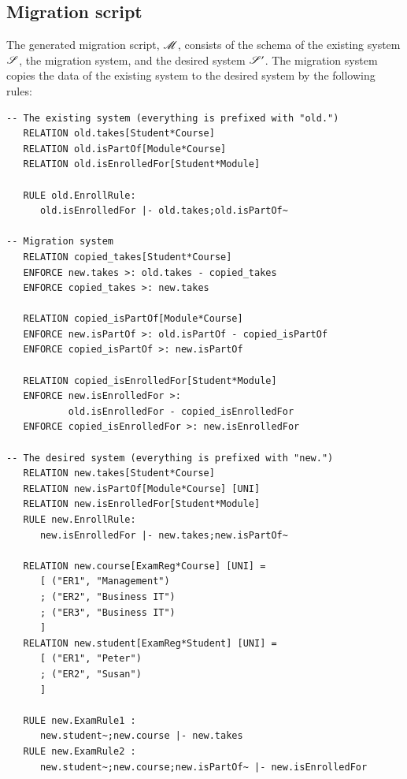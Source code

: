 \documentclass{elsarticle}
\begin{document}
\subsection{Migration script}
   The generated migration script, $\mathscr{M}$, consists of the schema of the existing system $\mathscr{S}$,
   the migration system, and the desired system $\mathscr{S}'$.
   The migration system copies the data of the existing system to the desired system by the following rules:
\begin{verbatim}
-- The existing system (everything is prefixed with "old.")
   RELATION old.takes[Student*Course]
   RELATION old.isPartOf[Module*Course]
   RELATION old.isEnrolledFor[Student*Module]

   RULE old.EnrollRule:
      old.isEnrolledFor |- old.takes;old.isPartOf~
      
-- Migration system
   RELATION copied_takes[Student*Course]
   ENFORCE new.takes >: old.takes - copied_takes
   ENFORCE copied_takes >: new.takes

   RELATION copied_isPartOf[Module*Course]
   ENFORCE new.isPartOf >: old.isPartOf - copied_isPartOf
   ENFORCE copied_isPartOf >: new.isPartOf

   RELATION copied_isEnrolledFor[Student*Module]
   ENFORCE new.isEnrolledFor >:
           old.isEnrolledFor - copied_isEnrolledFor
   ENFORCE copied_isEnrolledFor >: new.isEnrolledFor

-- The desired system (everything is prefixed with "new.")
   RELATION new.takes[Student*Course]
   RELATION new.isPartOf[Module*Course] [UNI]
   RELATION new.isEnrolledFor[Student*Module]
   RULE new.EnrollRule:
      new.isEnrolledFor |- new.takes;new.isPartOf~
      
   RELATION new.course[ExamReg*Course] [UNI] =
      [ ("ER1", "Management")
      ; ("ER2", "Business IT")
      ; ("ER3", "Business IT")
      ]
   RELATION new.student[ExamReg*Student] [UNI] =
      [ ("ER1", "Peter")
      ; ("ER2", "Susan")
      ]

   RULE new.ExamRule1 :
      new.student~;new.course |- new.takes
   RULE new.ExamRule2 :
      new.student~;new.course;new.isPartOf~ |- new.isEnrolledFor
\end{verbatim}
\end{document}
